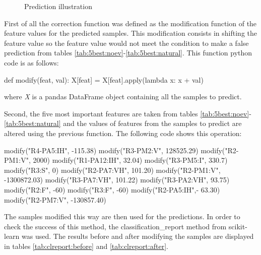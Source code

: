\begin{figure}[H]
    \centering
    \caption{Prediction illustration} \label{fig:predict}
\end{figure}

First of all the correction function was defined as the modification function of the feature values for the predicted samples. This modification consists in shifting the feature value so the feature value would not meet the condition to make a false prediction from tables \ref{tab:5best:noev}-\ref{tab:5best:natural}. This function python code is as follows:  
\begin{python}
def modify(feat, val):
    X[feat] = X[feat].apply(lambda x: x + val)
\end{python}
where \textit{X} is a pandas DataFrame object containing all the samples to predict.

Second, the five most important features are taken from tables \ref{tab:5best:noev}-\ref{tab:5best:natural} and the values of features from the samples to predict are altered using the previous function. The following code shows this operation:
\begin{python}
modify("R4-PA5:IH", -115.38)
modify("R3-PM2:V", 128525.29)
modify("R2-PM1:V", 2000)
modify("R1-PA12:IH", 32.04)
modify("R3-PM5:I", 330.7)
modify("R3:S", 0)
modify("R2-PA7:VH", 101.20)
modify("R2-PM1:V", -1300872.03)
modify("R3-PA7:VH", 101.22)
modify("R3-PA2:VH", 93.75)    
modify("R2:F", -60)
modify("R3:F", -60)
modify("R2-PA5:IH",- 63.30)
modify("R2-PM7:V", -130857.40) 
\end{python}

The samples modified this way are then used for the predictions. In order to check the success of this method, the classification\_report method from scikit-learn was used. The results before and after modifying the samples are displayed in tables \ref{tab:clreport:before} and \ref{tab:clreport:after}.

